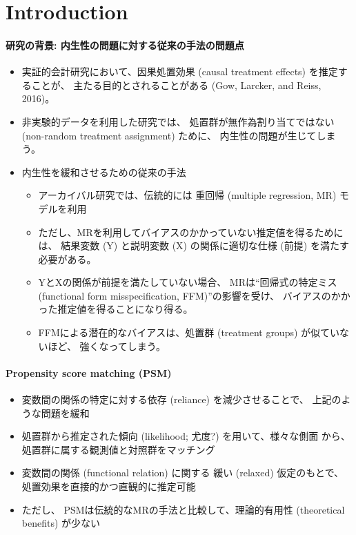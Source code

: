 \section{Introduction}

\paragraph{研究の背景: 内生性の問題に対する従来の手法の問題点}
\begin{itemize}
 \item 実証的会計研究において、因果処置効果 (causal treatment effects) を推定することが、
       主たる目的とされることがある (Gow, Larcker, and Reiss, 2016)。
 \item 非実験的データを利用した研究では、
       処置群が無作為割り当てではない (non-random treatment assignment) ために、
       内生性の問題が生じてしまう。
 \item 内生性を緩和させるための従来の手法
       \begin{itemize}
        \item アーカイバル研究では、伝統的には
              重回帰 (multiple regression, MR) モデルを利用
        \item ただし、MRを利用してバイアスのかかっていない推定値を得るためには、
              結果変数 (Y) と説明変数 (X) の関係に適切な仕様 (前提) を満たす必要がある。
        \item YとXの関係が前提を満たしていない場合、
              MRは``回帰式の特定ミス (functional form misspecification, FFM)''の影響を受け、
              バイアスのかかった推定値を得ることになり得る。
        \item FFMによる潜在的なバイアスは、処置群 (treatment groups) が似ていないほど、
              強くなってしまう。
       \end{itemize}
\end{itemize}

\paragraph{Propensity score matching (PSM)}
\begin{itemize}
 \item 変数間の関係の特定に対する依存 (reliance) を減少させることで、
       上記のような問題を緩和
 \item 処置群から推定された傾向 (likelihood; 尤度?) を用いて、様々な側面
       から、処置群に属する観測値と対照群をマッチング
 \item 変数間の関係 (functional relation) に関する
       緩い (relaxed) 仮定のもとで、処置効果を直接的かつ直観的に推定可能
 \item ただし、
       PSMは伝統的なMRの手法と比較して、理論的有用性 (theoretical
       benefits) が少ない
\end{itemize}

